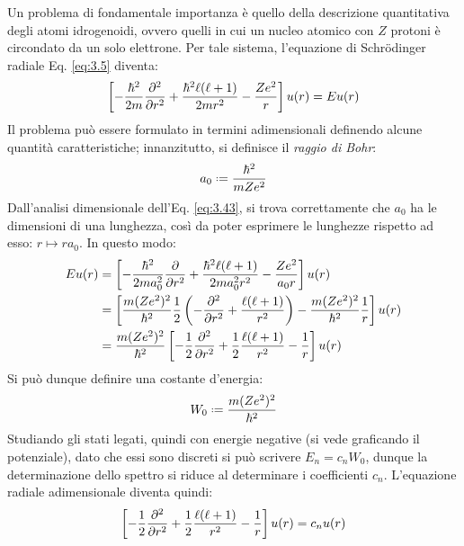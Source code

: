 Un problema di fondamentale importanza è quello della descrizione quantitativa degli atomi idrogenoidi, ovvero quelli in cui un nucleo atomico con $ Z $ protoni è circondato da un solo elettrone. Per tale sistema, l'equazione di Schrödinger radiale Eq. \ref{eq:3.5} diventa:
\begin{equation}
	\left[ -\frac{\hbar^2}{2m} \frac{\partial^2}{\partial r^2} + \frac{\hbar^2 \ell (\ell + 1)}{2mr^2} - \frac{Ze^2}{r} \right] u(r) = E u(r)
	\label{eq:3.43}
\end{equation}
Il problema può essere formulato in termini adimensionali definendo alcune quantità caratteristiche; innanzitutto, si definisce il \textit{raggio di Bohr}:
\begin{equation}
	a_0 \defeq \frac{\hbar^2}{mZe^2}
	\label{eq:3.44}
\end{equation}
Dall'analisi dimensionale dell'Eq. \ref{eq:3.43}, si trova correttamente che $ a_0 $ ha le dimensioni di una lunghezza, così da poter esprimere le lunghezze rispetto ad esso: $ r \mapsto r a_0 $. In questo modo:
\begin{equation*}
	\begin{split}
		E u(r)
		&= \left[ -\frac{\hbar^2}{2m a_0^2} \frac{\partial}{\partial r^2} + \frac{\hbar^2 \ell(\ell + 1)}{2ma_0^2 r^2} - \frac{Ze^2}{a_0 r} \right] u(r) \\
		&= \left[ \frac{m (Ze^2)^2}{\hbar^2} \frac{1}{2} \left( - \frac{\partial^2}{\partial r^2} + \frac{\ell (\ell + 1)}{r^2} \right) - \frac{m (Ze^2)^2}{\hbar^2} \frac{1}{r} \right] u(r) \\
		&= \frac{m(Ze^2)^2}{\hbar^2} \left[ - \frac{1}{2} \frac{\partial^2}{\partial r^2} + \frac{1}{2} \frac{\ell (\ell + 1)}{r^2} - \frac{1}{r} \right] u(r)
	\end{split}
\end{equation*}
Si può dunque definire una costante d'energia:
\begin{equation}
	W_0 \defeq \frac{m (Ze^2)^2}{\hbar^2}
	\label{eq:3.45}
\end{equation}
Studiando gli stati legati, quindi con energie negative (si vede graficando il potenziale), dato che essi sono discreti si può scrivere $ E_n = c_n W_0 $, dunque la determinazione dello spettro si riduce al determinare i coefficienti $ c_n $. L'equazione radiale adimensionale diventa quindi:
\begin{equation}
	\left[ -\frac{1}{2} \frac{\partial^2}{\partial r^2} + \frac{1}{2} \frac{\ell (\ell + 1)}{r^2} - \frac{1}{r} \right] u(r) = c_n u(r)
	\label{eq:3.46}
\end{equation}

